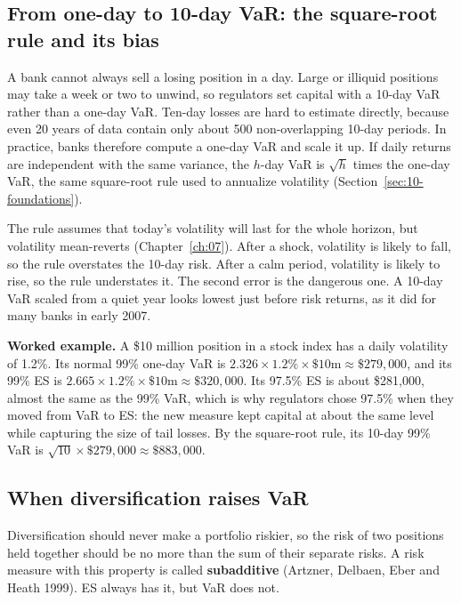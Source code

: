 \subsection{From one-day to 10-day VaR: the square-root rule and its bias}


A bank cannot always sell a losing position in a day. Large or illiquid positions may take a week or two to unwind, so regulators set capital with a 10-day VaR rather than a one-day VaR. Ten-day losses are hard to estimate directly, because even 20 years of data contain only about 500 non-overlapping 10-day periods. In practice, banks therefore compute a one-day VaR and scale it up. If daily returns are independent with the same variance, the $h$-day VaR is $\sqrt{h}$ times the one-day VaR, the same square-root rule used to annualize volatility (Section~\ref{sec:10-foundations}).

The rule assumes that today's volatility will last for the whole horizon, but volatility mean-reverts (Chapter~\ref{ch:07}). After a shock, volatility is likely to fall, so the rule overstates the 10-day risk. After a calm period, volatility is likely to rise, so the rule understates it. The second error is the dangerous one. A 10-day VaR scaled from a quiet year looks lowest just before risk returns, as it did for many banks in early 2007.

\textbf{Worked example.} A \$10 million position in a stock index has a daily volatility of 1.2\%. Its normal 99\% one-day VaR is $2.326 \times 1.2\% \times \$10\text{m} \approx \$279{,}000$, and its 99\% ES is $2.665 \times 1.2\% \times \$10\text{m} \approx \$320{,}000$. Its 97.5\% ES is about \$281{,}000, almost the same as the 99\% VaR, which is why regulators chose 97.5\% when they moved from VaR to ES: the new measure kept capital at about the same level while capturing the size of tail losses. By the square-root rule, its 10-day 99\% VaR is $\sqrt{10} \times \$279{,}000 \approx \$883{,}000$.

\subsection{When diversification raises VaR}

Diversification should never make a portfolio riskier, so the risk of two positions held together should be no more than the sum of their separate risks. A risk measure with this property is called \textbf{subadditive} (Artzner, Delbaen, Eber and Heath 1999). ES always has it, but VaR does not.

